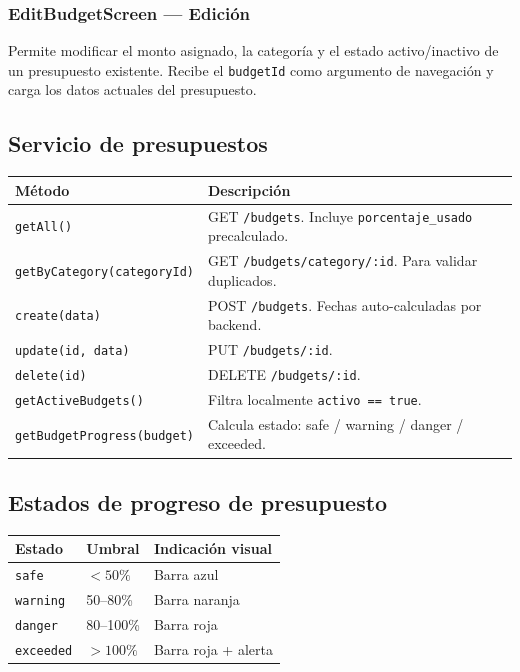 \documentclass[12pt, letterpaper]{article}
\newcommand{\endpoint}[1]{\texttt{\small\color{azulipn}#1}}
\newcommand{\campo}[1]{\texttt{#1}}
\begin{document}
\subsubsection{EditBudgetScreen — Edición}

Permite modificar el monto asignado, la categoría y el estado activo/inactivo
de un presupuesto existente. Recibe el \campo{budgetId} como argumento de
navegación y carga los datos actuales del presupuesto.

\subsection{Servicio de presupuestos}

\begin{tabular}{lp{8cm}}
  \toprule
  \textbf{Método} & \textbf{Descripción} \\
  \midrule
  \campo{getAll()} &
    GET \endpoint{/budgets}. Incluye \campo{porcentaje\_usado} precalculado. \\
  \campo{getByCategory(categoryId)} &
    GET \endpoint{/budgets/category/:id}. Para validar duplicados. \\
  \campo{create(data)} &
    POST \endpoint{/budgets}. Fechas auto-calculadas por backend. \\
  \campo{update(id, data)} &
    PUT \endpoint{/budgets/:id}. \\
  \campo{delete(id)} &
    DELETE \endpoint{/budgets/:id}. \\
  \campo{getActiveBudgets()} &
    Filtra localmente \campo{activo == true}. \\
  \campo{getBudgetProgress(budget)} &
    Calcula estado: safe / warning / danger / exceeded. \\
  \bottomrule
\end{tabular}

\subsection{Estados de progreso de presupuesto}

\begin{tabular}{llp{6cm}}
  \toprule
  \textbf{Estado} & \textbf{Umbral} & \textbf{Indicación visual} \\
  \midrule
  \campo{safe}     & $< 50\%$  & Barra azul \\
  \campo{warning}  & 50--80\%  & Barra naranja \\
  \campo{danger}   & 80--100\% & Barra roja \\
  \campo{exceeded} & $> 100\%$ & Barra roja + alerta \\
  \bottomrule
\end{tabular}
\end{document}

